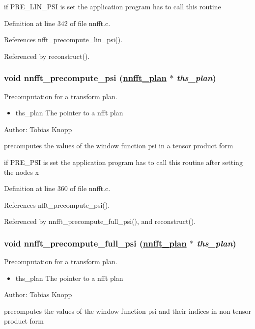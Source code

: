 if PRE\_\-LIN\_\-PSI is set the application program has to call this routine 

Definition at line 342 of file nnfft.c.

References nfft\_\-precompute\_\-lin\_\-psi().

Referenced by reconstruct().\hypertarget{group__nnfft_ga7}{
\subsubsection[nnfft\_\-precompute\_\-psi]{\setlength{\rightskip}{0pt plus 5cm}void nnfft\_\-precompute\_\-psi (\hyperlink{structnnfft__plan}{nnfft\_\-plan} $\ast$ {\em ths\_\-plan})}}
\label{group__nnfft_ga7}


Precomputation for a transform plan. 

\begin{itemize}
\item ths\_\-plan The pointer to a nfft plan\end{itemize}
\begin{Desc}
\item[Author:]Tobias Knopp\end{Desc}
precomputes the values of the window function psi in a tensor product form

if PRE\_\-PSI is set the application program has to call this routine after setting the nodes x 

Definition at line 360 of file nnfft.c.

References nfft\_\-precompute\_\-psi().

Referenced by nnfft\_\-precompute\_\-full\_\-psi(), and reconstruct().\hypertarget{group__nnfft_ga8}{
\subsubsection[nnfft\_\-precompute\_\-full\_\-psi]{\setlength{\rightskip}{0pt plus 5cm}void nnfft\_\-precompute\_\-full\_\-psi (\hyperlink{structnnfft__plan}{nnfft\_\-plan} $\ast$ {\em ths\_\-plan})}}
\label{group__nnfft_ga8}


Precomputation for a transform plan. 

\begin{itemize}
\item ths\_\-plan The pointer to a nfft plan\end{itemize}
\begin{Desc}
\item[Author:]Tobias Knopp\end{Desc}
precomputes the values of the window function psi and their indices in non tensor product form

